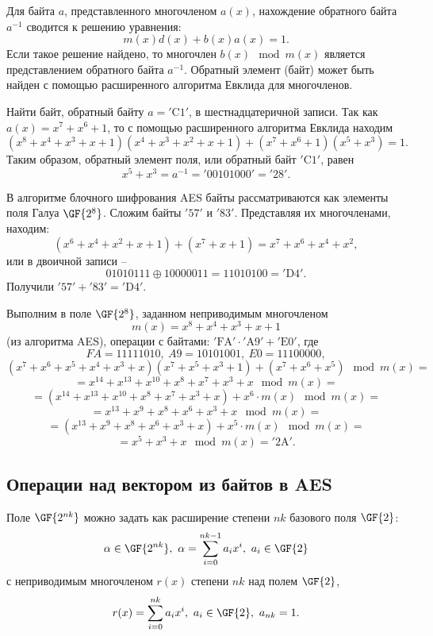 Для байта $a$, представленного многочленом $a(x)$, нахождение обратного байта $a^{-1}$ сводится к решению уравнения:
    \[ m(x) d(x) + b(x) a(x) = 1. \]
Если такое решение найдено, то многочлен $b(x) \mod m(x)$ является представлением обратного байта $a^{-1}$. Обратный элемент (байт) может быть найден с помощью расширенного алгоритма Евклида для многочленов.

\example
Найти байт, обратный байту $a = \mathrm{'C1'}$, в шестнадцатеричной записи. Так как $a(x) = x^{7} + x^{6} + 1$, то с помощью расширенного алгоритма Евклида находим
    \[ (x^{8} + x^{4} + x^{3} + x + 1) (x^{4} + x^{3} + x^{2} + x + 1) + (x^{7} + x^{6} + 1) (x^{5} + x^{3}) = 1. \]
Таким образом, обратный элемент поля, или обратный байт $\mathrm{'C1'}$, равен
    \[ x^{5} + x^{3} = a^{-1} = \mathrm{'00101000'} = \mathrm{'28'}. \]
\exampleend

\example
В алгоритме блочного шифрования AES байты рассматриваются как элементы поля Галуа $\GF{2^8}$. Сложим байты $\mathrm{'57'}$ и $\mathrm{'83'}$. Представляя их многочленами, находим:
    \[ (x^6 + x^4 + x^2 + x + 1) + (x^7 + x + 1) = x^7 + x^6 + x^4 + x^2, \]
или в двоичной записи --
    \[ 01010111 \oplus 10000011 = 11010100 = \mathrm{'D4'}. \]
Получили $\mathrm{'57'} + \mathrm{'83'} = \mathrm{'D4'}$.
\exampleend

\example
Выполним в поле $\GF{2^8}$, заданном неприводимым многочленом
    \[ m(x) = x^8 + x^4 + x^3 + x + 1 \]
(из алгоритма AES), операции с байтами: $\mathrm{'FA'} \cdot \mathrm{'A9'} + \mathrm{'E0'}$, где
    \[ FA = 11111010, ~ A9 = 10101001, ~ E0 = 11100000, \]
    \[ (x^7 + x^6 + x^5 + x^4 + x^3  +x)(x^7 + x^5 + x^3 + 1) + (x^7 + x^6 + x^5) \mod m(x) = \]
    \[ = x^{14} + x^{13} + x^{10} + x^{8} + x^7 + x^3 + x \mod m(x) = \]
    \[ = (x^{14} + x^{13} + x^{10} + x^{8} + x^7 + x^3 + x) + x^6 \cdot m(x) \mod m(x) = \]
    \[ = x^{13} + x^9 + x^8 + x^6 + x^3 + x \mod m(x) = \]
    \[ = (x^{13} + x^9 + x^8 + x^6 + x^3 + x) + x^5 \cdot m(x) \mod m(x) = \]
    \[ = x^5 + x^3 + x \mod m(x) = \mathrm{'2A'}. \]
\exampleend


\subsection{Операции над вектором из байтов в AES}

Поле $\GF{2^{nk}}$ можно задать как расширение степени $nk$ базового поля $\GF{2}$:
    \[ \alpha \in \GF{2^{nk}}, ~ \alpha = \sum\limits_{i=0}^{nk-1} a_i x^i, ~ a_i \in \GF{2} \]
с неприводимым многочленом $r(x)$ степени $nk$ над полем $\GF{2}$,
    \[ r(x) = \sum\limits_{i=0}^{nk} a_i x^i, ~ a_i \in \GF{2}, ~ a_{nk} = 1. \]

